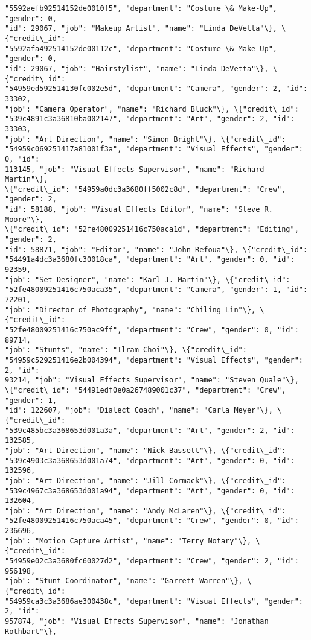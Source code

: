 \documentclass[11pt]{article}
\begin{document}
\begin{tcolorbox}[breakable, size=fbox, boxrule=.5pt, pad at break*=1mm, opacityfill=0]
\begin{Verbatim}[commandchars=\\\{\}]
"5592aefb92514152de0010f5", "department": "Costume \& Make-Up", "gender": 0,
"id": 29067, "job": "Makeup Artist", "name": "Linda DeVetta"\}, \{"credit\_id":
"5592afa492514152de00112c", "department": "Costume \& Make-Up", "gender": 0,
"id": 29067, "job": "Hairstylist", "name": "Linda DeVetta"\}, \{"credit\_id":
"54959ed592514130fc002e5d", "department": "Camera", "gender": 2, "id": 33302,
"job": "Camera Operator", "name": "Richard Bluck"\}, \{"credit\_id":
"539c4891c3a36810ba002147", "department": "Art", "gender": 2, "id": 33303,
"job": "Art Direction", "name": "Simon Bright"\}, \{"credit\_id":
"54959c069251417a81001f3a", "department": "Visual Effects", "gender": 0, "id":
113145, "job": "Visual Effects Supervisor", "name": "Richard Martin"\},
\{"credit\_id": "54959a0dc3a3680ff5002c8d", "department": "Crew", "gender": 2,
"id": 58188, "job": "Visual Effects Editor", "name": "Steve R. Moore"\},
\{"credit\_id": "52fe48009251416c750aca1d", "department": "Editing", "gender": 2,
"id": 58871, "job": "Editor", "name": "John Refoua"\}, \{"credit\_id":
"54491a4dc3a3680fc30018ca", "department": "Art", "gender": 0, "id": 92359,
"job": "Set Designer", "name": "Karl J. Martin"\}, \{"credit\_id":
"52fe48009251416c750aca35", "department": "Camera", "gender": 1, "id": 72201,
"job": "Director of Photography", "name": "Chiling Lin"\}, \{"credit\_id":
"52fe48009251416c750ac9ff", "department": "Crew", "gender": 0, "id": 89714,
"job": "Stunts", "name": "Ilram Choi"\}, \{"credit\_id":
"54959c529251416e2b004394", "department": "Visual Effects", "gender": 2, "id":
93214, "job": "Visual Effects Supervisor", "name": "Steven Quale"\},
\{"credit\_id": "54491edf0e0a267489001c37", "department": "Crew", "gender": 1,
"id": 122607, "job": "Dialect Coach", "name": "Carla Meyer"\}, \{"credit\_id":
"539c485bc3a368653d001a3a", "department": "Art", "gender": 2, "id": 132585,
"job": "Art Direction", "name": "Nick Bassett"\}, \{"credit\_id":
"539c4903c3a368653d001a74", "department": "Art", "gender": 0, "id": 132596,
"job": "Art Direction", "name": "Jill Cormack"\}, \{"credit\_id":
"539c4967c3a368653d001a94", "department": "Art", "gender": 0, "id": 132604,
"job": "Art Direction", "name": "Andy McLaren"\}, \{"credit\_id":
"52fe48009251416c750aca45", "department": "Crew", "gender": 0, "id": 236696,
"job": "Motion Capture Artist", "name": "Terry Notary"\}, \{"credit\_id":
"54959e02c3a3680fc60027d2", "department": "Crew", "gender": 2, "id": 956198,
"job": "Stunt Coordinator", "name": "Garrett Warren"\}, \{"credit\_id":
"54959ca3c3a3686ae300438c", "department": "Visual Effects", "gender": 2, "id":
957874, "job": "Visual Effects Supervisor", "name": "Jonathan Rothbart"\},

\end{Verbatim}
\end{tcolorbox}
\end{document}
